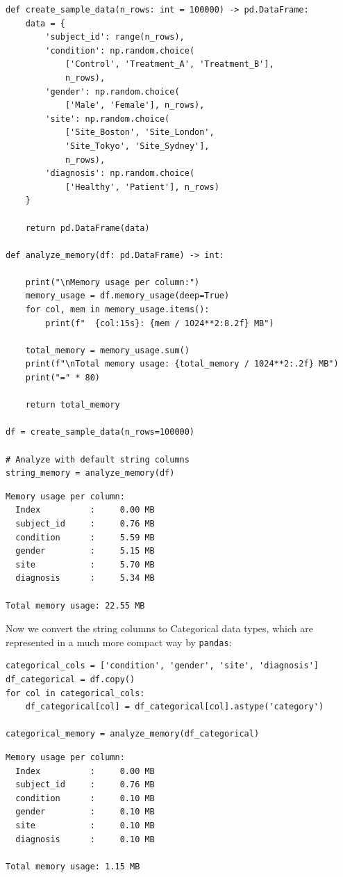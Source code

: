 \begin{lstlisting}[style=Python]
def create_sample_data(n_rows: int = 100000) -> pd.DataFrame:
    data = {
        'subject_id': range(n_rows),
        'condition': np.random.choice(
            ['Control', 'Treatment_A', 'Treatment_B'],
            n_rows),
        'gender': np.random.choice(
            ['Male', 'Female'], n_rows),
        'site': np.random.choice(
            ['Site_Boston', 'Site_London', 
            'Site_Tokyo', 'Site_Sydney'],
            n_rows),
        'diagnosis': np.random.choice(
            ['Healthy', 'Patient'], n_rows)
    }
    
    return pd.DataFrame(data)

def analyze_memory(df: pd.DataFrame) -> int:

    print("\nMemory usage per column:")
    memory_usage = df.memory_usage(deep=True)
    for col, mem in memory_usage.items():
        print(f"  {col:15s}: {mem / 1024**2:8.2f} MB")
    
    total_memory = memory_usage.sum()
    print(f"\nTotal memory usage: {total_memory / 1024**2:.2f} MB")
    print("=" * 80)
    
    return total_memory

df = create_sample_data(n_rows=100000)

# Analyze with default string columns
string_memory = analyze_memory(df)
\end{lstlisting}

\begin{lstlisting}[style=shell]
Memory usage per column:
  Index          :     0.00 MB
  subject_id     :     0.76 MB
  condition      :     5.59 MB
  gender         :     5.15 MB
  site           :     5.70 MB
  diagnosis      :     5.34 MB

Total memory usage: 22.55 MB
\end{lstlisting}

Now we convert the string columns to Categorical data types, which are represented in a much more compact way by \texttt{pandas}:

\begin{lstlisting}[style=Python]
categorical_cols = ['condition', 'gender', 'site', 'diagnosis']
df_categorical = df.copy()
for col in categorical_cols:
    df_categorical[col] = df_categorical[col].astype('category')

categorical_memory = analyze_memory(df_categorical)
\end{lstlisting}

\begin{lstlisting}[style=shell]
Memory usage per column:
  Index          :     0.00 MB
  subject_id     :     0.76 MB
  condition      :     0.10 MB
  gender         :     0.10 MB
  site           :     0.10 MB
  diagnosis      :     0.10 MB

Total memory usage: 1.15 MB
\end{lstlisting}

